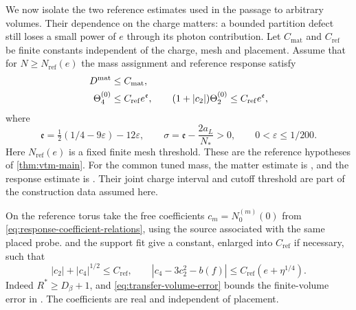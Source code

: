 We now isolate the two reference estimates used in the
passage to arbitrary volumes. Their dependence on the
charge matters: a bounded partition defect still loses
a small power of $e$ through its photon contribution.
Let $C_{\mathrm{mat}}$ and $C_{\mathrm{ref}}$ be finite constants
independent of the charge, mesh and placement. Assume
that for $N\ge N_{\mathrm{ref}}(e)$ the mass assignment and reference
response satisfy
\begin{align}
 D^{\mathrm{mat}}&\le C_{\mathrm{mat}},\notag\\
 \Theta_4^{(0)}&\le C_{\mathrm{ref}} e^{\mathfrak e},\qquad
 (1+|c_2|)\Theta_2^{(0)}
                          \le C_{\mathrm{ref}} e^{\mathfrak e},
                                   \label{eq:transfer-terminal-input}
\end{align}
where
\begin{equation}\label{eq:transfer-charge-exponents}
 \mathfrak e=\tfrac12(1/4-9\varepsilon)-12\varepsilon,\qquad
 \sigma=\mathfrak e-\frac{2a_L}{N_*}>0,\qquad
 0<\varepsilon\le1/200.
\end{equation}
Here $N_{\mathrm{ref}}(e)$ is a fixed finite mesh threshold.
These are the reference hypotheses of \cref{thm:vtm-main}.
For the common tuned mass, the matter estimate is
\cite[Theorem~A, (5)]{TerminalPressure}, and the response
estimate is \cite[Theorem~A]{ReferenceResponse}.
Their joint charge interval and cutoff threshold are part
of the construction data assumed here.

On the reference torus take the free coefficients
$c_m=N_0^{(m)}(0)$ from
\eqref{eq:response-coefficient-relations}, using the
source associated with the same placed probe.
\cite[Proposition~5.2]{PositiveProbe}
and the support fit give a constant, enlarged into
$C_{\mathrm{ref}}$ if necessary, such that
\begin{equation}\label{eq:transfer-free-input}
 |c_2|+|c_4|^{1/2}\le C_{\mathrm{ref}},\qquad
 |c_4-3c_2^2-b(f)|
              \le C_{\mathrm{ref}}(e+\eta^{1/4}).
\end{equation}
Indeed $R^*\ge D_\beta+1$, and
\eqref{eq:transfer-volume-error} bounds the finite-volume
error in \cite[Theorem~B]{PositiveProbe}.
The coefficients are real and independent of placement.

